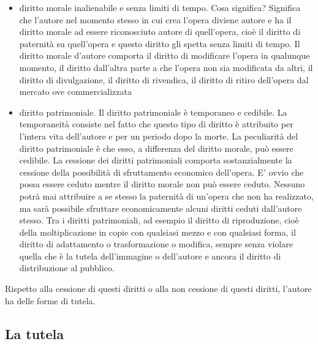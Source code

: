 \begin{itemize}
    \item diritto morale inalienabile e senza limiti di tempo. Cosa significa? Significa che l'autore nel momento stesso in cui crea l'opera diviene autore e ha il diritto morale ad essere riconosciuto autore di quell'opera, cioè il diritto di paternità su quell'opera e questo diritto gli spetta senza limiti di tempo. Il diritto morale d'autore comporta il diritto di modificare l'opera in qualunque momento, il diritto dall'altra parte a che l'opera non sia modificata da altri, il diritto di divulgazione, il diritto di rivendica, il diritto di ritiro dell'opera dal mercato ove commercializzata
    \item diritto patrimoniale. Il diritto patrimoniale è temporaneo e cedibile. La temporaneità consiste nel fatto che questo tipo di diritto è attribuito per l'intera vita dell'autore e per un periodo dopo la morte. La peculiarità del diritto patrimoniale è che esso, a differenza del diritto morale, può essere cedibile. La cessione dei diritti patrimoniali comporta sostanzialmente la cessione della possibilità di sfruttamento economico dell'opera. E' ovvio che possa essere ceduto mentre il diritto morale non può essere ceduto. Nessuno potrà mai attribuire a se stesso la paternità di un'opera che non ha realizzato, ma sarà possibile sfruttare economicamente alcuni diritti ceduti dall'autore stesso. Tra i diritti patrimoniali, ad esempio il diritto di riproduzione, cioè della moltiplicazione in copie con qualsiasi mezzo e con qualsiasi forma, il diritto di adattamento o trasformazione o modifica, sempre senza violare quella che è la tutela dell'immagine o dell'autore e ancora il diritto di distribuzione al pubblico.
\end{itemize}

 Rispetto alla cessione di questi diritti o alla non cessione di questi diritti, l'autore ha delle forme di tutela. 

\subsection{La tutela}

